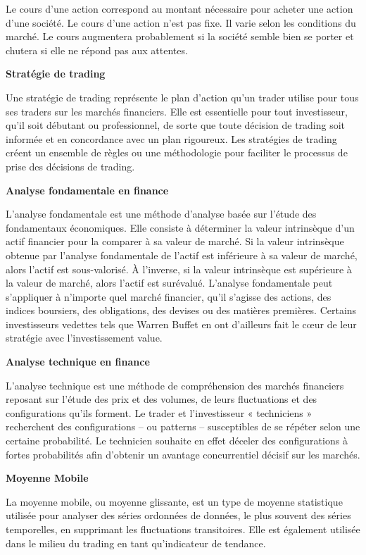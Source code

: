 Le cours d'une action correspond au montant nécessaire pour acheter une
action d'une société. Le cours d'une action n'est pas fixe. Il varie
selon les conditions du marché. Le cours augmentera probablement si la
société semble bien se porter et chutera si elle ne répond pas aux
attentes.

\textbf{Stratégie de trading}

Une stratégie de trading représente le plan d'action qu'un trader
utilise pour tous ses traders sur les marchés financiers. Elle est
essentielle pour tout investisseur, qu'il soit débutant ou
professionnel, de sorte que toute décision de trading soit informée et
en concordance avec un plan rigoureux. Les stratégies de trading créent
un ensemble de règles ou une méthodologie pour faciliter le processus de
prise des décisions de trading.

\textbf{Analyse fondamentale en finance}

L'analyse fondamentale est une méthode d'analyse basée sur l'étude des
fondamentaux économiques. Elle consiste à déterminer la valeur
intrinsèque d'un actif financier pour la comparer à sa valeur de marché.
Si la valeur intrinsèque obtenue par l'analyse fondamentale de l'actif
est inférieure à sa valeur de marché, alors l'actif est sous-valorisé. À
l'inverse, si la valeur intrinsèque est supérieure à la valeur de
marché, alors l'actif est surévalué. L'analyse fondamentale peut
s'appliquer à n'importe quel marché financier, qu'il s'agisse des
actions, des indices boursiers, des obligations, des devises ou des
matières premières. Certains investisseurs vedettes tels que Warren
Buffet en ont d'ailleurs fait le cœur de leur stratégie avec
l'investissement value.

\textbf{Analyse technique en finance}

L'analyse technique est une méthode de compréhension des marchés
financiers reposant sur l'étude des prix et des volumes, de leurs
fluctuations et des configurations qu'ils forment. Le trader et
l'investisseur « techniciens » recherchent des configurations -- ou
patterns -- susceptibles de se répéter selon une certaine probabilité.
Le technicien souhaite en effet déceler des configurations à fortes
probabilités afin d'obtenir un avantage concurrentiel décisif sur les
marchés.

\textbf{Moyenne Mobile}

La moyenne mobile, ou moyenne glissante, est un type de moyenne
statistique utilisée pour analyser des séries ordonnées de données, le
plus souvent des séries temporelles, en supprimant les fluctuations
transitoires. Elle est également utilisée dans le milieu du trading en
tant qu'indicateur de tendance.


